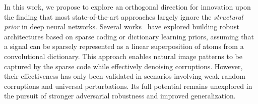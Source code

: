 
In this work, we propose to explore an orthogonal direction for innovation
upon the finding that most state-of-the-art approaches largely ignore the \emph{structural prior} in deep neural networks. 
Several works~\citep{papyan2017convolutional, cazenavette2021architectural, mahdizadehaghdam2019deep, li2022revisiting} have explored building robust architectures based on sparse coding or dictionary learning priors, assuming that a signal can be sparsely represented as a linear superposition of atoms from a convolutional dictionary. This approach enables natural image patterns to be captured by the sparse code while effectively denoising corruptions. However, their effectiveness has only been validated in scenarios involving weak random corruptions and universal perturbations. Its full potential remains unexplored in the pursuit of stronger adversarial robustness and improved generalization.





